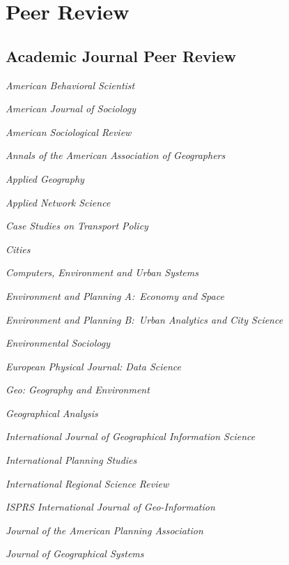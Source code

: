 \documentclass[11pt,letterpaper]{report} %
\newcommand{\listitemspace}{0.25em}
\renewenvironment{itemize}
{\begin{list}{}{\setlength{\leftmargin}{0em}
                \setlength{\parskip}{0em}
                \setlength{\itemsep}{\listitemspace}
                \setlength{\parsep}{\listitemspace}}}
{\end{list}}
\begin{document}
    \section*{Peer Review}

    \subsection*{Academic Journal Peer Review}

    \begin{itemize}

        \item \textit{American Behavioral Scientist}
        \item \textit{American Journal of Sociology}
        \item \textit{American Sociological Review}
        \item \textit{Annals of the American Association of Geographers}
        \item \textit{Applied Geography}
        \item \textit{Applied Network Science}
        \item \textit{Case Studies on Transport Policy}
        \item \textit{Cities}
        \item \textit{Computers, Environment and Urban Systems}
        \item \textit{Environment and Planning A:\ Economy and Space}
        \item \textit{Environment and Planning B:\ Urban Analytics and City Science}
        \item \textit{Environmental Sociology}
        \item \textit{European Physical Journal: Data Science}
        \item \textit{Geo: Geography and Environment}
        \item \textit{Geographical Analysis}
        \item \textit{International Journal of Geographical Information Science}
        \item \textit{International Planning Studies}
        \item \textit{International Regional Science Review}
        \item \textit{ISPRS International Journal of Geo-Information}
        \item \textit{Journal of the American Planning Association}
        \item \textit{Journal of Geographical Systems}

\end{itemize}
\end{document}
